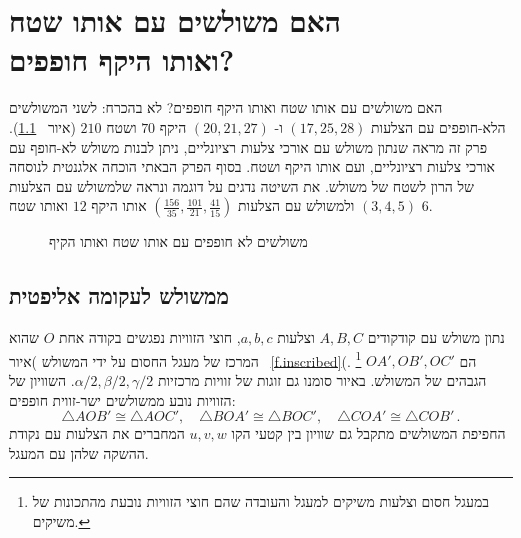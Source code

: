 


\chapter[\R{האם משולשים עם אותו שטח ואותו היקף חופפים?}]{האם משולשים עם אותו שטח\\
ואותו היקף חופפים?}
\label{c.congruent}


האם משולשים עם אותו שטח ואותו היקף חופפים? לא בהכרח: לשני המשולשים הלא-חופפים עם הצלעות
$(17,25,28)$
ו-%
$(20,21,27)$
היקף
$70$
ושטח 
$210$
(איור%
~\ref{f.congruent-first-example}).
פרק זה מראה שנתון משולש עם אורכי צלעות רציונליים, ניתן לבנות משולש לא-חופף עם אורכי צלעות רציונליים, ועם אותו היקף ושטח.
בסוף הפרק הבאתי הוכחה אלגנטית לנוסחה של הרון לשטח של משולש. את השיטה נדגים על דוגמה ונראה שלמשולש עם הצלעות 
$(3,4,5)$
ולמשולש עם הצלעות
$(\frac{156}{35},\frac{101}{21},\frac{41}{15})$
אותו היקף
$12$
ואותו שטח
$6$.

\begin{figure}[htb]
\begin{center}
\end{center}
\caption{משולשים לא חופפים עם אותו שטח ואותו הקיף}\label{f.congruent-first-example}
\end{figure}


\section{ממשולש לעקומה אליפטית}

נתון משולש עם קודקודים
$A,B,C$
וצלעות
$a,b,c$,
חוצי הזוויות נפגשים בקודה אחת
$O$
שהוא המרכז של מעגל החסום על ידי המשולש )איור~%
\ref{f.inscribed}(.%
\footnote{במעגל חסום וצלעות משיקים למעגל והעובדה שהם חוצי הזוויות נובעת מהתכונות של משיקים.}
$OA',OB',OC'$
הם הגבהים של המשולש. באיור סומנו גם זוגות של זוויות מרכזיות
$\alpha/2,\beta/2,\gamma/2$.
השוויון של הזוויות נובע ממשולשים ישר-זווית חופפים:
\[
\triangle AOB'\cong \triangle AOC',\quad \triangle BOA'\cong \triangle BOC', \quad \triangle COA'\cong \triangle COB'\,.
\]
החפיפת המשולשים מתקבל גם שוויון בין קטעי הקו 
$u,v,w$
המחברים את הצלעות עם נקודת ההשקה שלהן עם המעגל.



